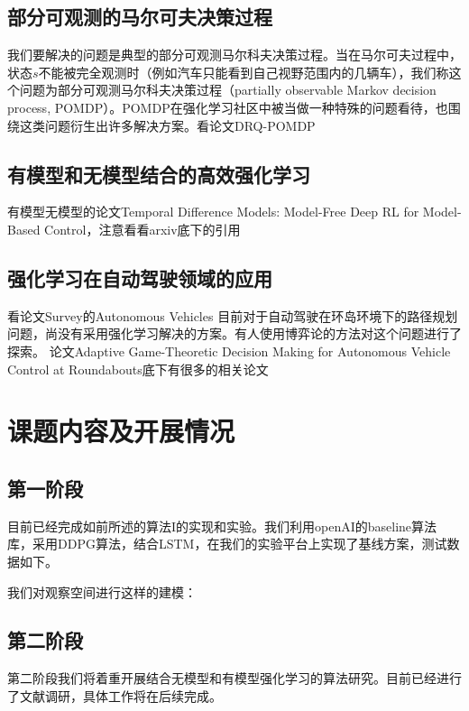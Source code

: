 \documentclass[degree=bachelor, tocarialchapter, pifootnote]{thuthesis}
\begin{document}
  \subsection{部分可观测的马尔可夫决策过程}
    我们要解决的问题是典型的部分可观测马尔科夫决策过程。当在马尔可夫过程中，状态$s$不能被完全观测时（例如汽车只能看到自己视野范围内的几辆车），我们称这个问题为部分可观测马尔科夫决策过程（partially observable Markov decision process, POMDP）。POMDP在强化学习社区中被当做一种特殊的问题看待，也围绕这类问题衍生出许多解决方案。看论文DRQ-POMDP
  
  \subsection{有模型和无模型结合的高效强化学习}
  有模型无模型的论文Temporal Difference Models: Model-Free Deep RL for Model-Based Control，注意看看arxiv底下的引用
  
  \subsection{强化学习在自动驾驶领域的应用}
    看论文Survey的Autonomous Vehicles
    目前对于自动驾驶在环岛环境下的路径规划问题，尚没有采用强化学习解决的方案。有人使用博弈论的方法对这个问题进行了探索。
    论文Adaptive Game-Theoretic Decision Making for Autonomous Vehicle Control at Roundabouts底下有很多的相关论文

\section{课题内容及开展情况}
  \subsection{第一阶段}
  目前已经完成如前所述的算法I的实现和实验。我们利用openAI的baseline算法库\cite{openAI_baselines}，采用DDPG\cite{DDPG}算法，结合LSTM\cite{DRQ}，在我们的实验平台上实现了基线方案，测试数据如下。\par
  我们对观察空间进行这样的建模：
  
  \subsection{第二阶段}
    第二阶段我们将着重开展结合无模型和有模型强化学习的算法研究。目前已经进行了文献调研，具体工作将在后续完成。
\end{document}
